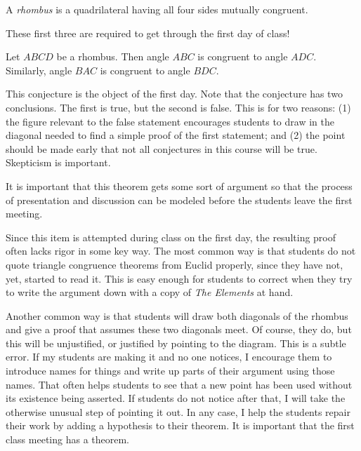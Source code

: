 \begin{definition}\label{defn:rhombus}
A \emph{rhombus} is a quadrilateral having all four sides mutually congruent.
\end{definition}

\begin{annotation}
{
\color{blue}
These first three are required to get through the first day of class! 
}
\end{annotation}

\begin{conjecture}\label{conj:rhombus-angles}
Let $ABCD$ be a rhombus. Then angle $ABC$ is congruent to angle $ADC$. Similarly, angle $BAC$ is congruent to angle $BDC$.
\end{conjecture}

\begin{annotation}
{
\color{blue}
This conjecture is the object of the first day.
Note that the conjecture has two conclusions.
The first is true, but the second is false.
This is for two reasons:
(1) the figure relevant to the false statement encourages students to draw in the diagonal needed to find a simple proof of the first statement; and
(2) the point should be made early that not all conjectures in this course will be true.
Skepticism is important.

It is important that this theorem gets some sort of argument so that the process of presentation and discussion can be modeled before the students leave the first meeting.

Since this item is attempted during class on the first day, the resulting proof often lacks rigor in some key way. The most common way is that students do not quote triangle congruence theorems from Euclid properly, since they have not, yet, started to read it. This is easy enough for students to correct when they try to write the argument down with a copy of \emph{The Elements} at hand. 

Another common way is that students will draw both diagonals of the rhombus and give a proof that assumes these two diagonals meet. Of course, they do, but this will be unjustified, or justified by pointing to the diagram. 
This is a subtle error. If my students are making it and no 
one notices, I encourage them to introduce names for things and write up parts of their argument using those names.
That often helps students to see that a new point has been used without its existence being asserted. If students do not notice after that, I will take the otherwise unusual step of pointing it out. In any case, I help the students repair their work by adding a hypothesis to their theorem. It is important that the first class meeting has a theorem.
}
\end{annotation}

